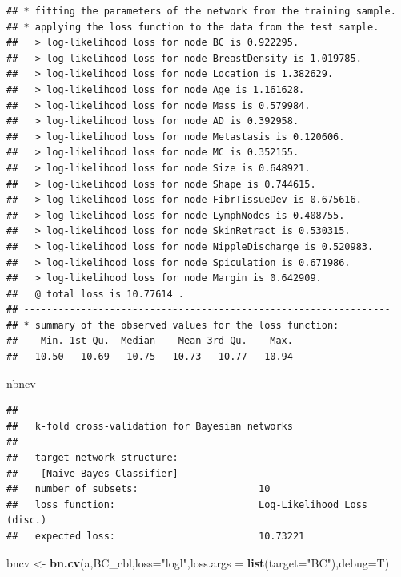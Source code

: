 \documentclass[]{article}
\newenvironment{Shaded}{\begin{snugshade}}{\end{snugshade}}
\newcommand{\KeywordTok}[1]{\textcolor[rgb]{0.13,0.29,0.53}{\textbf{{#1}}}}
\newcommand{\DataTypeTok}[1]{\textcolor[rgb]{0.13,0.29,0.53}{{#1}}}
\newcommand{\StringTok}[1]{\textcolor[rgb]{0.31,0.60,0.02}{{#1}}}
\newcommand{\NormalTok}[1]{{#1}}
\begin{document}
\begin{verbatim}
## * fitting the parameters of the network from the training sample.
## * applying the loss function to the data from the test sample.
##   > log-likelihood loss for node BC is 0.922295.
##   > log-likelihood loss for node BreastDensity is 1.019785.
##   > log-likelihood loss for node Location is 1.382629.
##   > log-likelihood loss for node Age is 1.161628.
##   > log-likelihood loss for node Mass is 0.579984.
##   > log-likelihood loss for node AD is 0.392958.
##   > log-likelihood loss for node Metastasis is 0.120606.
##   > log-likelihood loss for node MC is 0.352155.
##   > log-likelihood loss for node Size is 0.648921.
##   > log-likelihood loss for node Shape is 0.744615.
##   > log-likelihood loss for node FibrTissueDev is 0.675616.
##   > log-likelihood loss for node LymphNodes is 0.408755.
##   > log-likelihood loss for node SkinRetract is 0.530315.
##   > log-likelihood loss for node NippleDischarge is 0.520983.
##   > log-likelihood loss for node Spiculation is 0.671986.
##   > log-likelihood loss for node Margin is 0.642909.
##   @ total loss is 10.77614 .
## ----------------------------------------------------------------
## * summary of the observed values for the loss function:
##    Min. 1st Qu.  Median    Mean 3rd Qu.    Max. 
##   10.50   10.69   10.75   10.73   10.77   10.94
\end{verbatim}

\begin{Shaded}
\begin{Highlighting}[]
\NormalTok{nbncv}
\end{Highlighting}
\end{Shaded}

\begin{verbatim}
## 
##   k-fold cross-validation for Bayesian networks
## 
##   target network structure:
##    [Naive Bayes Classifier]
##   number of subsets:                     10 
##   loss function:                         Log-Likelihood Loss (disc.) 
##   expected loss:                         10.73221
\end{verbatim}

\begin{Shaded}
\begin{Highlighting}[]
\NormalTok{bncv <-}\StringTok{ }\KeywordTok{bn.cv}\NormalTok{(a,BC_cbl,}\DataTypeTok{loss=}\StringTok{"logl"}\NormalTok{,}\DataTypeTok{loss.args =} \KeywordTok{list}\NormalTok{(}\DataTypeTok{target=}\StringTok{"BC"}\NormalTok{),}\DataTypeTok{debug=}\NormalTok{T)}
\end{Highlighting}
\end{Shaded}
\end{document}
